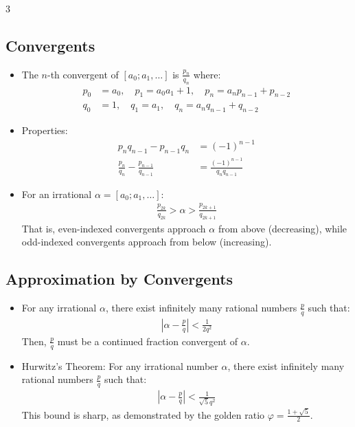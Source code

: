 \documentclass[8,a4paper]{article}
\begin{document}
\begin{multicols}{3}
	\subsection{Convergents}
	\begin{itemize}[leftmargin=*]
		\item The $n$-th convergent of $[a_0; a_1, \ldots]$ is $\frac{p_n}{q_n}$ where:
		      \begin{align*}
			      p_0 & = a_0, \quad p_1 = a_0a_1 + 1, \quad p_n = a_np_{n-1} + p_{n-2} \\
			      q_0 & = 1, \quad q_1 = a_1, \quad q_n = a_nq_{n-1} + q_{n-2}
		      \end{align*}
		\item Properties:
		      \begin{align*}
			      p_nq_{n-1} - p_{n-1}q_n                   & = (-1)^{n-1}                    \\
			      \frac{p_n}{q_n} - \frac{p_{n-1}}{q_{n-1}} & = \frac{(-1)^{n-1}}{q_nq_{n-1}}
		      \end{align*}
		\item For an irrational $\alpha = [a_0; a_1, \ldots]$:
		      \begin{align*}
			      \frac{p_{2k}}{q_{2k}} > \alpha > \frac{p_{2k+1}}{q_{2k+1}}
		      \end{align*}
		      That is, even-indexed convergents approach $\alpha$ from above (decreasing), while odd-indexed convergents approach from below (increasing).
	\end{itemize}

	\subsection{Approximation by Convergents}
	\begin{itemize}[leftmargin=*]
		\item For any irrational $\alpha$, there exist infinitely many rational numbers $\frac{p}{q}$ such that:
		      \begin{align*}
			      \left|\alpha - \frac{p}{q}\right| < \frac{1}{2q^2}
		      \end{align*}
		      Then, $\frac{p}{q}$ must be a continued fraction convergent of $\alpha$.
		\item Hurwitz's Theorem: For any irrational number $\alpha$, there exist infinitely many rational numbers $\frac{p}{q}$ such that:
		      \begin{align*}
			      \left|\alpha - \frac{p}{q}\right| < \frac{1}{\sqrt{5}q^2}
		      \end{align*}
		      This bound is sharp, as demonstrated by the golden ratio $\varphi = \frac{1+\sqrt{5}}{2}$.
	\end{itemize}


\end{multicols}
\end{document}
